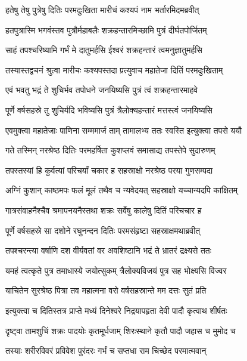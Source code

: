 
\twolineshloka
{हतेषु तेषु पुत्रेषु दितिः परमदुःखिता}
{मारीचं कश्यपं नाम भर्तारमिदमब्रवीत्} %

\twolineshloka
{हतपुत्रास्मि भगवंस्तव पुत्रौर्महाबलैः}
{शक्रहन्तारमिच्छामि पुत्रं दीर्घतपोर्जितम्} %

\twolineshloka
{साहं तपश्चरिष्यामि गर्भं मे दातुमर्हसि}
{ईश्वरं शक्रहन्तारं त्वमनुज्ञातुमर्हसि} %

\twolineshloka
{तस्यास्तद्वचनं श्रुत्वा मारीचः कश्यपस्तदा}
{प्रत्युवाच महातेजा दितिं परमदुःखिताम्} %

\twolineshloka
{एवं भवतु भद्रं ते शुचिर्भव तपोधने}
{जनयिष्यसि पुत्रं त्वं शक्रहन्तारमाहवे} %

\twolineshloka
{पूर्णे वर्षसहस्रे तु शुचिर्यदि भविष्यसि}
{पुत्रं त्रैलोक्यहन्तारं मत्तस्त्वं जनयिष्यसि} %

\twolineshloka
{एवमुक्त्वा महातेजाः पाणिना सम्ममार्ज ताम्}
{तामालभ्य ततः स्वस्ति इत्युक्त्वा तपसे ययौ} %

\twolineshloka
{गते तस्मिन् नरश्रेष्ठ दितिः परमहर्षिता}
{कुशप्लवं समासाद्य तपस्तेपे सुदारुणम्} %

\twolineshloka
{तपस्तस्यां हि कुर्वत्यां परिचर्यां चकार ह}
{सहस्राक्षो नरश्रेष्ठ परया गुणसम्पदा} %

\twolineshloka
{अग्निं कुशान् काष्ठमपः फलं मूलं तथैव च}
{न्यवेदयत् सहस्राक्षो यच्चान्यदपि कांक्षितम्} %

\twolineshloka
{गात्रसंवाहनैश्चैव श्रमापनयनैस्तथा}
{शक्रः सर्वेषु कालेषु दितिं परिचचार ह} %

\twolineshloka
{पूर्णे वर्षसहस्रे सा दशोने रघुनन्दन}
{दितिः परमसंहृष्टा सहस्राक्षमथाब्रवीत्} %

\twolineshloka
{तपश्चरन्त्या वर्षाणि दश वीर्यवतां वर}
{अवशिष्टानि भद्रं ते भ्रातरं द्रक्ष्यसे ततः} %

\twolineshloka
{यमहं त्वत्कृते पुत्र तमाधास्ये जयोत्सुकम्}
{त्रैलोक्यविजयं पुत्र सह भोक्ष्यसि विज्वर} %

\twolineshloka
{याचितेन सुरश्रेष्ठ पित्रा तव महात्मना}
{वरो वर्षसहस्रान्ते मम दत्तः सुतं प्रति} %

\twolineshloka
{इत्युक्त्वा च दितिस्तत्र प्राप्ते मध्यं दिनेश्वरे}
{निद्रयापहृता देवी पादौ कृत्वाथ शीर्षतः} %

\twolineshloka
{दृष्ट्वा तामशुचिं शक्रः पादयोः कृतमूर्धजाम्}
{शिरःस्थाने कृतौ पादौ जहास च मुमोद च} %

\twolineshloka
{तस्याः शरीरविवरं प्रविवेश पुरंदरः}
{गर्भं च सप्तधा राम चिच्छेद परमात्मवान्} %

